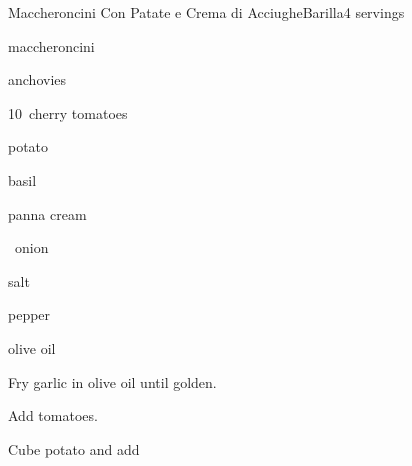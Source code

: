 \begin{recipe}{Maccheroncini Con Patate e Crema di Acciughe}{Barilla}{4 servings}

\begin{ingredients}
\item {} maccheroncini
\item {} anchovies
\item 10~cherry tomatoes
\item potato
\item basil
\item {} panna cream
\item \half~onion
\item salt
\item pepper
\item olive oil
\end{ingredients}

\begin{directions}
\item Fry garlic in olive oil until golden.
\item Add tomatoes.
\item Cube potato and add
\end{directions}

\end{recipe}
